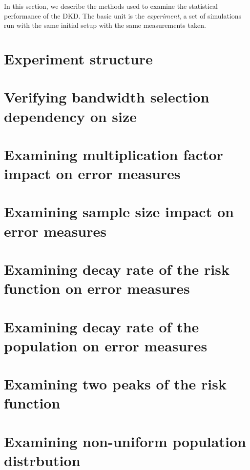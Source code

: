 

In this section, we describe the methods used to examine the statistical performance of the DKD.
The basic unit is the \textit{experiment}, a set of simulations run with the same initial setup with the same measurements taken.


\section{Experiment structure}

\section{Verifying bandwidth selection dependency on size}

\section{Examining multiplication factor impact on error measures}

\section{Examining sample size impact on error measures}

\section{Examining decay rate of the risk function on error measures}

\section{Examining decay rate of the population on error measures}

\section{Examining two peaks of the risk function}

\section{Examining non-uniform population distrbution}